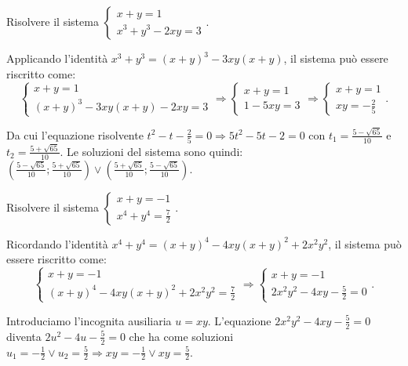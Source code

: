 \begin{exrig}
\begin{esempio}
Risolvere il sistema $\left\{\begin{array}{l}{x+y=1}\\{x^3+y^3-2{xy}=3}\end{array}\right.$.

Applicando l'identità $x^3+y^3=(x+y)^3-3{xy}(x+y)$, il sistema può essere riscritto come: \[ \left\{\begin{array}{l}{x+y=1}\\{(x+y)^3-3{xy}(x+y)-2{xy}=3}\end{array}\right.\Rightarrow \left\{\begin{array}{l}{x+y=1}\\{1-5{xy}=3}\end{array}\right.\Rightarrow \left\{\begin{array}{l}{x+y=1}\\{{xy}=-\frac 2 5}\end{array}\right..\]

Da cui l'equazione risolvente $t^2-t-\frac 2 5=0\Rightarrow 5t^2-5t-2=0$ con $t_1=\frac{5-\sqrt{65}}{10}$ e $t_2=\frac{5+\sqrt{65}}{10}$.
Le soluzioni del sistema sono quindi: $\left(\frac{5-\sqrt{65}}{10};\frac{5+\sqrt{65}}{10}\right) \vee \left(\frac{5+\sqrt{65}}{10};\frac{5-\sqrt{65}}{10}\right)$.
\end{esempio}

\begin{esempio}
Risolvere il sistema $\left\{\begin{array}{l}{x+y=-1}\\{x^4+y^4=\frac 7 2}\end{array}\right.$.

Ricordando l'identità $x^4+y^4=(x+y)^4-4{xy}(x+y)^2+2x^2y^2$, il sistema può essere riscritto come: \[\left\{\begin{array}{l}{x+y=-1}\\{(x+y)^4-4{xy}(x+y)^2+2x^2y^2=\frac 7 2}\end{array}\right. \Rightarrow \left\{\begin{array}{l}{x+y=-1}\\{2x^2y^2-4{xy}-\frac 5 2=0}\end{array}\right..\]

Introduciamo l'incognita ausiliaria $u=xy$. L'equazione $2x^2y^2-4{xy}-\frac 5 2=0$ diventa $2u^2-4u-\frac 5 2=0$ che ha come soluzioni $u_1=-\frac 1 2\vee u_2=\frac 5 2\Rightarrow {xy}=-\frac 1 2\vee {xy}=\frac 5 2$.


\end{esempio}
\end{exrig}

